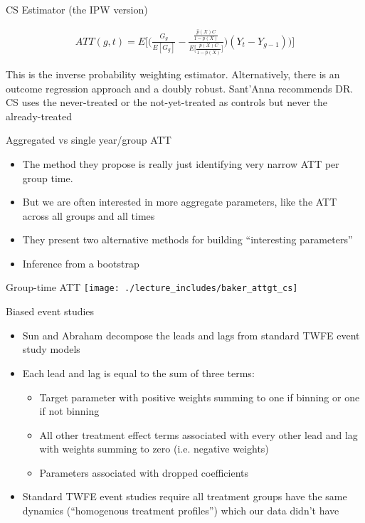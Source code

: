 \documentclass{beamer}
\begin{document}
\begin{frame}{CS Estimator (the IPW version)}

\begin{eqnarray*}
ATT(g,t) = E \bigg [ \bigg ( \frac{G_g}{E[G_g]} - \frac{ \frac{\hat{p}(X)C}{1-\hat{p}(X)}}{E \bigg [ \frac{\hat{p}(X)C}{1-\hat{p}(X)} \bigg ]} \bigg ) (Y_t - Y_{g-1} ) \bigg ) \bigg ]
\end{eqnarray*}

This is the inverse probability weighting estimator.  Alternatively, there is an outcome regression approach and a doubly robust. Sant'Anna recommends DR.  CS uses the never-treated or the not-yet-treated as controls but never the already-treated 
\end{frame}




\begin{frame}{Aggregated vs single year/group ATT}

\begin{itemize}
\item The method they propose is really just identifying very narrow ATT per group time.
\item But we are often interested in  more aggregate parameters, like the ATT across all groups and all times
\item They present two alternative methods for building ``interesting parameters'' 
\item Inference from a bootstrap
\end{itemize}


\end{frame}



\begin{frame}{Group-time ATT }
             \texttt{[image: ./lecture\_includes/baker\_attgt\_cs]}

\end{frame}

\begin{frame}{Biased event studies}

\begin{itemize}

\item Sun and Abraham decompose the leads and lags from standard TWFE event study models
\item Each lead and lag is equal to the sum of three terms:
	\begin{itemize}
	\item Target parameter with positive weights summing to one if binning or one if not binning
	\item All other treatment effect terms associated with every other lead and lag with weights summing to zero (i.e. negative weights)
	\item Parameters associated with dropped coefficients
	\end{itemize}
\item Standard TWFE event studies require all treatment groups have the same dynamics (``homogenous treatment profiles'') which our data didn't have
\end{itemize}

\end{frame}
\end{document}
